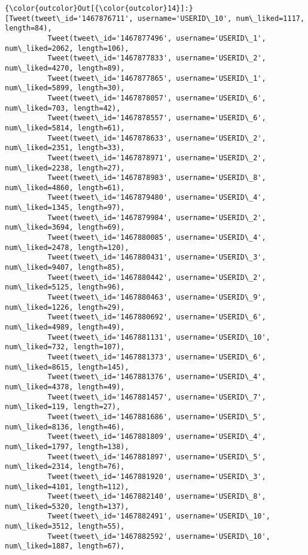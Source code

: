 \documentclass[11pt]{article}
\begin{document}
\begin{Verbatim}[commandchars=\\\{\}]
{\color{outcolor}Out[{\color{outcolor}14}]:} [Tweet(tweet\_id='1467876711', username='USERID\_10', num\_liked=1117, length=84),
          Tweet(tweet\_id='1467877496', username='USERID\_1', num\_liked=2062, length=106),
          Tweet(tweet\_id='1467877833', username='USERID\_2', num\_liked=4270, length=89),
          Tweet(tweet\_id='1467877865', username='USERID\_1', num\_liked=5899, length=30),
          Tweet(tweet\_id='1467878057', username='USERID\_6', num\_liked=703, length=42),
          Tweet(tweet\_id='1467878557', username='USERID\_6', num\_liked=5814, length=61),
          Tweet(tweet\_id='1467878633', username='USERID\_2', num\_liked=2351, length=33),
          Tweet(tweet\_id='1467878971', username='USERID\_2', num\_liked=2238, length=27),
          Tweet(tweet\_id='1467878983', username='USERID\_8', num\_liked=4860, length=61),
          Tweet(tweet\_id='1467879480', username='USERID\_4', num\_liked=1345, length=97),
          Tweet(tweet\_id='1467879984', username='USERID\_2', num\_liked=3694, length=69),
          Tweet(tweet\_id='1467880085', username='USERID\_4', num\_liked=2478, length=120),
          Tweet(tweet\_id='1467880431', username='USERID\_3', num\_liked=9407, length=85),
          Tweet(tweet\_id='1467880442', username='USERID\_2', num\_liked=5125, length=96),
          Tweet(tweet\_id='1467880463', username='USERID\_9', num\_liked=1226, length=29),
          Tweet(tweet\_id='1467880692', username='USERID\_6', num\_liked=4989, length=49),
          Tweet(tweet\_id='1467881131', username='USERID\_10', num\_liked=732, length=107),
          Tweet(tweet\_id='1467881373', username='USERID\_6', num\_liked=8615, length=145),
          Tweet(tweet\_id='1467881376', username='USERID\_4', num\_liked=4378, length=49),
          Tweet(tweet\_id='1467881457', username='USERID\_7', num\_liked=119, length=27),
          Tweet(tweet\_id='1467881686', username='USERID\_5', num\_liked=8136, length=46),
          Tweet(tweet\_id='1467881809', username='USERID\_4', num\_liked=1797, length=138),
          Tweet(tweet\_id='1467881897', username='USERID\_5', num\_liked=2314, length=76),
          Tweet(tweet\_id='1467881920', username='USERID\_3', num\_liked=4101, length=112),
          Tweet(tweet\_id='1467882140', username='USERID\_8', num\_liked=5320, length=137),
          Tweet(tweet\_id='1467882491', username='USERID\_10', num\_liked=3512, length=55),
          Tweet(tweet\_id='1467882592', username='USERID\_10', num\_liked=1887, length=67),

\end{Verbatim}
\end{document}
